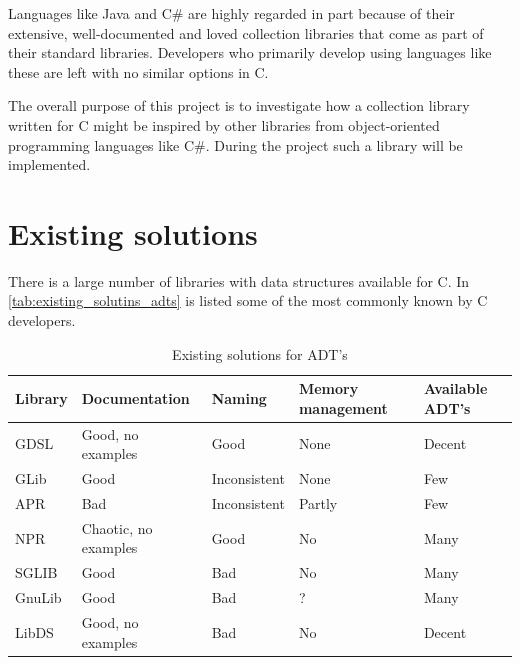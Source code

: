 \documentclass[table]{ituthesis}
\begin{document}
Languages like Java and C\# are highly regarded in part because of their extensive, well-documented and loved collection libraries that come as part of their standard libraries. Developers who primarily develop using languages like these are left with no similar options in C.

The overall purpose of this project is to investigate how a collection library written for C might be inspired by other libraries from object-oriented programming languages like C\#. During the project such a library will be implemented.

\section{Existing solutions}\label{sec:existing_solutions}
There is a large number of libraries with data structures available for C. In \autoref{tab:existing_solutins_adts} is listed some of the most commonly known by C developers.

\begin{table}
	\begin{center}
	    \begin{tabular}{ | l | p{3cm} | l | p{2.5cm} | p{2.5cm} |}
			\hline
			\rowcolor{gray!50}
		    \textbf{Library} & \textbf{Documentation}        & \textbf{Naming}       & \textbf{Memory management} & \textbf{Available ADT's} \\ \hline
		    GDSL    & Good, no examples    & Good         & None              & Decent          \\ \hline
		    GLib    & Good                 & Inconsistent & None              & Few             \\ \hline
		    APR     & Bad                  & Inconsistent & Partly            & Few             \\ \hline
		    NPR     & Chaotic, no examples & Good         & No                & Many            \\ \hline
		    SGLIB   & Good                 & Bad          & No                & Many            \\ \hline
		    GnuLib  & Good                 & Bad          & ?                 & Many            \\ \hline
		    LibDS   & Good, no examples    & Bad          & No                & Decent          \\ \hline
	    \end{tabular}
	\end{center}
	\caption{Existing solutions for ADT's}
	\label{tab:existing_solutins_adts}
\end{table}
\end{document}
